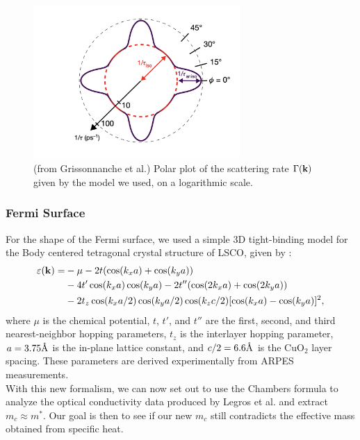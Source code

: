 \begin{figure}
    \centering
    \includegraphics[width=0.7\textwidth]{figures/polar_log_scattering.png}
    \caption{(from Grissonnanche et al.\cite{grissonnanche2021}) Polar plot of the scattering rate $\Gamma(\vb{k})$ given by the model we used, on a logarithmic scale.}
    \label{fig:log_scattering}
\end{figure}


\subsubsection{Fermi Surface}
For the shape of the Fermi surface, we used a simple 3D tight-binding model for the Body centered
tetragonal crystal structure of LSCO, given by :
\begin{equation}
\begin{aligned}
    \varepsilon(\vb{k}) = &-\mu - 2t(\cos(k_x a) + \cos(k_y a)) \\
        &- 4t'\cos(k_x a)\cos(k_y a) - 2t''(\cos(2k_x a) + \cos(2k_y a)) \\
        &- 2t_z\cos(k_x a / 2)\cos(k_y a / 2)\cos(k_z c / 2)[\cos(k_x a) - \cos(k_y a)]^2,
\end{aligned}
\end{equation}
where $\mu$ is the chemical potential, $t$, $t'$, and $t''$ are the first, second, and third
nearest-neighbor hopping parameters, $t_z$ is the interlayer hopping parameter,
$a=3.75\textup{\AA}$ is the in-plane lattice constant, and $c/2=6.6\textup{\AA}$ is the
$\mathrm{CuO_2}$ layer spacing. These parameters are derived experimentally from ARPES measurements\cite{horio2018}. \\

With this new formalism, we can now set out to use the Chambers formula to analyze the optical conductivity data produced by Legros et al.\cite{legros2022} and extract $m_c \approx m^*$.
Our goal is then to see if our new $m_c$ still contradicts the effective mass obtained from specific heat. 
